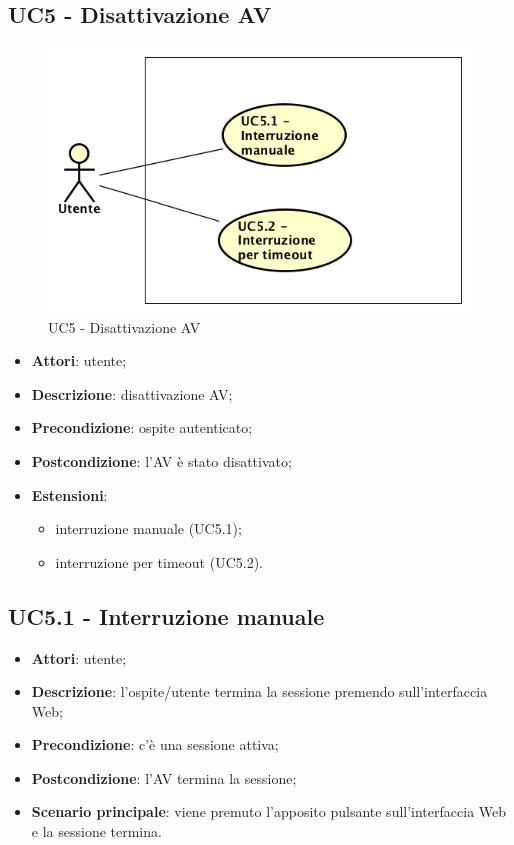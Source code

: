 \documentclass[../AnalisiDeiRequisiti.tex]{subfiles}
\begin{document}
\subsection{UC5 - Disattivazione AV}
\begin{figure}[!h]
	\centering
	\includegraphics[width=\textwidth]{UseCases/UC5-Disattivazione/UC5.png}
	\caption{UC5 - Disattivazione AV}
\end{figure}	
\label{sssec:UC5} 
\begin{itemize} 
\item \textbf{Attori}: utente;
\item \textbf{Descrizione}: disattivazione AV;
\item \textbf{Precondizione}: ospite autenticato;
\item \textbf{Postcondizione}: l'AV è stato disattivato;
\item \textbf{Estensioni}:\begin{itemize}\item interruzione manuale (UC5.1);\item interruzione per timeout (UC5.2).\end{itemize}
\end{itemize} 
\subsection{UC5.1 - Interruzione manuale} 
\label{sssec:UC5.1} 
\begin{itemize} 
\item \textbf{Attori}: utente;
\item \textbf{Descrizione}: l'ospite/utente termina la sessione premendo sull'interfaccia Web;
\item \textbf{Precondizione}: c'è una sessione attiva;
\item \textbf{Postcondizione}: l'AV termina la sessione;
\item \textbf{Scenario principale}: viene premuto l'apposito pulsante sull'interfaccia Web e la sessione termina.\end{itemize} 
\end{document}
